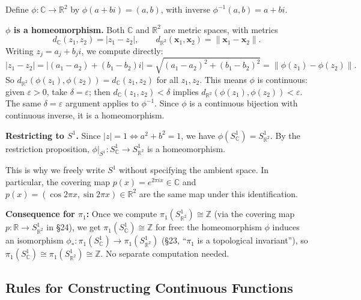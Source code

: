 \documentclass[11pt]{report}
\begin{document}
\begin{exbox}
Define $\phi: \mathbb{C} \to \mathbb{R}^2$ by $\phi(a + bi) = (a, b)$, with inverse $\phi^{-1}(a, b) = a + bi$.

\textbf{$\phi$ is a homeomorphism.} Both $\mathbb{C}$ and $\mathbb{R}^2$ are metric spaces, with metrics
\[d_{\mathbb{C}}(z_1, z_2) = |z_1 - z_2|, \qquad d_{\mathbb{R}^2}(\mathbf{x}_1, \mathbf{x}_2) = \|\mathbf{x}_1 - \mathbf{x}_2\|.\]
Writing $z_j = a_j + b_j i$, we compute directly:
\[|z_1 - z_2| = |(a_1 - a_2) + (b_1 - b_2)i| = \sqrt{(a_1-a_2)^2 + (b_1-b_2)^2} = \|\phi(z_1) - \phi(z_2)\|.\]
So $d_{\mathbb{R}^2}(\phi(z_1), \phi(z_2)) = d_{\mathbb{C}}(z_1, z_2)$ for all $z_1, z_2$. This means $\phi$ is continuous: given $\varepsilon > 0$, take $\delta = \varepsilon$; then $d_{\mathbb{C}}(z_1, z_2) < \delta$ implies $d_{\mathbb{R}^2}(\phi(z_1), \phi(z_2)) < \varepsilon$. The same $\delta = \varepsilon$ argument applies to $\phi^{-1}$. Since $\phi$ is a continuous bijection with continuous inverse, it is a homeomorphism.

\textbf{Restricting to $S^1$.} Since $|z| = 1 \iff a^2 + b^2 = 1$, we have $\phi(S^1_{\mathbb{C}}) = S^1_{\mathbb{R}^2}$. By the restriction proposition, $\phi|_{S^1}: S^1_{\mathbb{C}} \to S^1_{\mathbb{R}^2}$ is a homeomorphism.

This is why we freely write $S^1$ without specifying the ambient space. In particular, the covering map $p(x) = e^{2\pi i x} \in \mathbb{C}$ and $p(x) = (\cos 2\pi x, \sin 2\pi x) \in \mathbb{R}^2$ are the same map under this identification.

\textbf{Consequence for $\pi_1$:} Once we compute $\pi_1(S^1_{\mathbb{R}^2}) \cong \mathbb{Z}$ (via the covering map $p: \mathbb{R} \to S^1_{\mathbb{R}^2}$ in \S 24), we get $\pi_1(S^1_{\mathbb{C}}) \cong \mathbb{Z}$ for free: the homeomorphism $\phi$ induces an isomorphism $\phi_*: \pi_1(S^1_{\mathbb{C}}) \to \pi_1(S^1_{\mathbb{R}^2})$ (\S 23, ``$\pi_1$ is a topological invariant''), so $\pi_1(S^1_{\mathbb{C}}) \cong \pi_1(S^1_{\mathbb{R}^2}) \cong \mathbb{Z}$. No separate computation needed.
\end{exbox}

\subsection{Rules for Constructing Continuous Functions}
\end{document}

